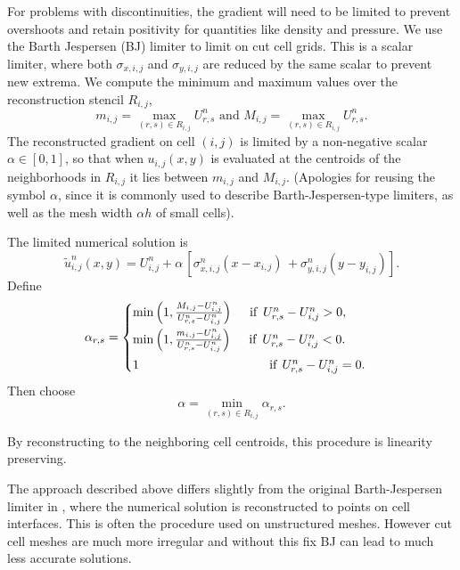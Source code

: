For problems with discontinuities, the gradient will need to be limited
to prevent overshoots and retain positivity for quantities like density and
pressure.
We use the Barth Jespersen (BJ)  limiter \cite{barth-jespersen} to limit on 
cut cell grids. 
This is a scalar limiter, where both $\sigma_{x,i,j}$ and $\sigma_{y,i,j}$ 
are reduced by the same scalar to prevent new extrema.  
We compute the minimum and maximum values over the reconstruction 
stencil $R_{i,j}$, 
\begin{equation} 
m_{i,j} = \max_{(r,s) \in R_{i,j}} U^n_{r,s} \text{ and } 
M_{i,j} = \max_{(r,s) \in R_{i,j}} U^n_{r,s}.
\label{eqn:bj1}
\end{equation}
The reconstructed gradient on cell $(i,j)$ is limited by a non-negative 
scalar $\alpha \in [0,1]$, so that when ${u}_{i,j}(x,y)$ 
is evaluated at the centroids of the neighborhoods in $R_{i,j}$ it
lies between $m_{i,j}$ and $M_{i,j}$.
(Apologies for reusing the symbol $\alpha$, since it is commonly 
used to describe Barth-Jespersen-type limiters, as well as the 
mesh width $\alpha h$  of small cells).

The limited numerical solution is
\begin{equation}
     \tilde{u}^n_{i,j}(x,y) = U_{i,j}^n + \alpha \, [{\sigma}^n_{x,i,j} ( x -  x_{i,j}) \, 
   + {\sigma}^n_{y,i,j}( y -  y_{i,j})].
\end{equation}
Define
\begin{equation}\label{eq:bj_alpha}
    \alpha_{r,s} = \begin{cases}
           \min \left(1,\frac{M_{i,j}-U_{i,j}^n}{U^n_{r,s} - U_{i,j}^n} \right)
    \quad  \text{ if } \,   U_{r,s}^n - U_{i,j}^n >  0,\\[.08in]
            \min \left(1, \frac{m_{i,j}-U_{i,j}^n}{U^n_{r,s} - U_{i,j}^n} \right)  
    \quad  \text{ if }  \, U^n_{r,s} - U_{i,j}^n < 0.\\[.08in]
             1    \hspace*{1.45in}  \text{if} \; \, U^n_{r,s} - U_{i,j}^n = 0.
    \end{cases}
\end{equation}
Then choose
\begin{equation}\label{eqn:alpha}
\alpha = \min_{(r,s) \in R_{i,j}} \alpha_{r,s} .
\end{equation}

By reconstructing to the neighboring cell centroids, this procedure is linearity preserving.  

The approach described above differs slightly from the original Barth-Jespersen limiter in
\cite{barth-jespersen}, where the numerical solution is reconstructed to 
points on cell interfaces.
This is often the procedure used on unstructured meshes. However cut cell meshes are much more
irregular and without this fix BJ can lead to much less accurate solutions.

